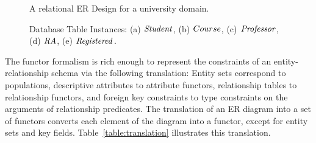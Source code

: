 \documentclass{acm_proc_article-sp}
\begin{document}
\begin{figure}[htbp] %
 \centering
{} 
\caption{A relational ER Design for a university domain.}
 \label{fig:university-schema}
\end{figure}


\begin{figure}[htbp] %
 \centering
{} 
\caption{Database Table Instances: (a) $\mathit{Student}$, (b) $Course$, (c) $\mathit{Professor}$, (d) $\mathit{RA}$, (e) $\mathit{Registered}$.  
}
 \label{fig:instance}
\end{figure}


The functor formalism is rich enough to represent the constraints of an entity-relationship schema via the following translation: Entity sets correspond to populations, descriptive attributes to attribute functors, relationship tables to relationship functors, and foreign key constraints to type constraints on the arguments of relationship predicates. The translation of an ER diagram into a set of functors converts each element of the diagram into a functor, except for entity sets and key fields. Table~\ref{table:translation} illustrates this translation.
\end{document}
